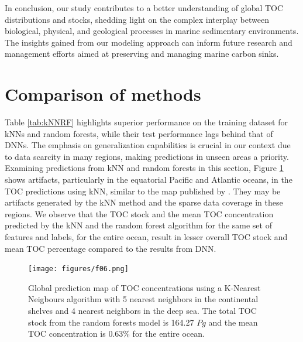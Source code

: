 \documentclass[journal abbreviation, manuscript]{copernicus}
\begin{document}
In conclusion, our study contributes to a better understanding of global TOC distributions and stocks, shedding light on the complex interplay between biological, physical, and geological processes in marine sedimentary environments. The insights gained from our modeling approach can inform future research and management efforts aimed at preserving and managing marine carbon sinks.




\newpage
\appendix
\section{Comparison of methods}
\label{appendix:kNNRF}

Table \ref{tab:kNNRF} highlights superior performance on the training dataset for kNNs and random forests, while their test performance lags behind that of DNNs. The emphasis on generalization capabilities is crucial in our context due to data scarcity in many regions, making predictions in unseen areas a priority. Examining predictions from kNN and random forests in this section, Figure \ref{fig:tocPercent_kNN} shows artifacts, particularly in the equatorial Pacific and Atlantic oceans, in the TOC predictions using kNN, similar to the map published by \cite{LeeTOCkNN}.  They may be artifacts generated by the kNN method and the sparse data coverage in these regions. We observe that the TOC stock and the mean TOC concentration predicted by the kNN and the random forest algorithm for the same set of features and labels, for the entire ocean, result in lesser overall TOC stock and mean TOC percentage compared to the results from DNN.
\appendixfigures  

\begin{figure}[!htb]
    \centering
    \texttt{[image: figures/f06.png]}
    \caption{Global prediction map of TOC concentrations using a K-Nearest Neigbours algorithm with 5 nearest neighbors in the continental shelves and 4 nearest neighbors in the deep sea. The total TOC stock from the random forests model is 164.27 $Pg$ and the mean TOC concentration is 0.63\% for the entire ocean.}
    \label{fig:tocPercent_kNN}
\end{figure}
\end{document}
